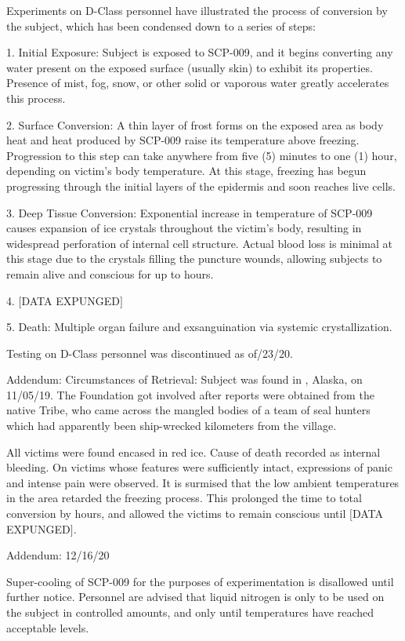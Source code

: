\documentclass[a4paper, 11pt]{article}
\newcommand{\lb}{\ensuremath{[}}
\newcommand{\rb}{\ensuremath{]}}
\newcommand{\expunged}{\lb DATA EXPUNGED\rb}
\begin{document}
Experiments on D-Class personnel have illustrated the process of conversion by the subject, which has been condensed down to a series of steps:

1. Initial Exposure: Subject is exposed to SCP-009, and it begins converting any water present on the exposed surface (usually skin) to exhibit its properties. Presence of mist, fog, snow, or other solid or vaporous water greatly accelerates this process.

2. Surface Conversion: A thin layer of frost forms on the exposed area as body heat and heat produced by SCP-009 raise its temperature above freezing. Progression to this step can take anywhere from five (5) minutes to one (1) hour, depending on victim's body temperature. At this stage, freezing has begun progressing through the initial layers of the epidermis and soon reaches live cells.

3. Deep Tissue Conversion: Exponential increase in temperature of SCP-009 causes expansion of ice crystals throughout the victim's body, resulting in widespread perforation of internal cell structure. Actual blood loss is minimal at this stage due to the crystals filling the puncture wounds, allowing subjects to remain alive and conscious for up to  hours.

4. \expunged

5. Death: Multiple organ failure and exsanguination via systemic crystallization.

Testing on D-Class personnel was discontinued as of/23/20.

Addendum: Circumstances of Retrieval: Subject was found in , Alaska, on 11/05/19. The Foundation got involved after reports were obtained from the native  Tribe, who came across the mangled bodies of a team of seal hunters which had apparently been ship-wrecked  kilometers from the village.

All victims were found encased in red ice. Cause of death recorded as internal bleeding. On victims whose features were sufficiently intact, expressions of panic and intense pain were observed. It is surmised that the low ambient temperatures in the area retarded the freezing process. This prolonged the time to total conversion by  hours, and allowed the victims to remain conscious until \expunged.

Addendum: 12/16/20

Super-cooling of SCP-009 for the purposes of experimentation is disallowed until further notice. Personnel are advised that liquid nitrogen is only to be used on the subject in controlled amounts, and only until temperatures have reached acceptable levels.
\end{document}
